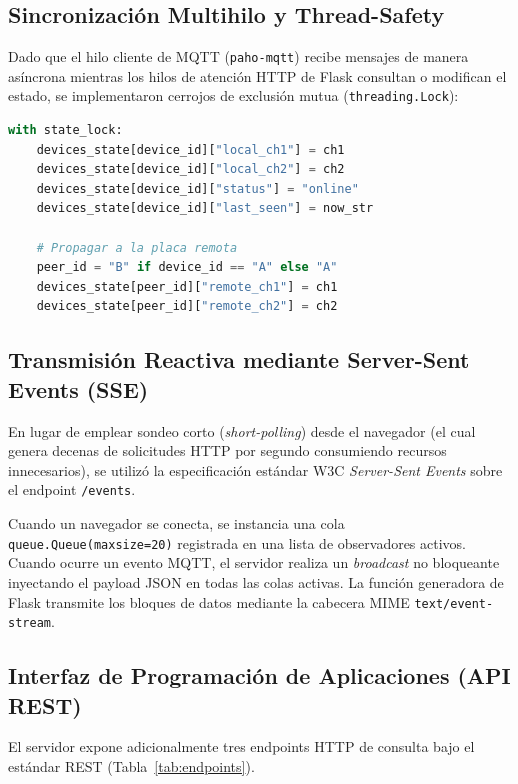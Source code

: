 \documentclass[11pt,a4paper]{article}
\begin{document}
\subsection{Sincronización Multihilo y Thread-Safety}
Dado que el hilo cliente de MQTT (\texttt{paho-mqtt}) recibe mensajes de manera asíncrona mientras los hilos de atención HTTP de Flask consultan o modifican el estado, se implementaron cerrojos de exclusión mutua (\texttt{threading.Lock}):
\begin{lstlisting}[language=Python, caption={Actualización segura de estados en RAM mediante locks}]
with state_lock:
    devices_state[device_id]["local_ch1"] = ch1
    devices_state[device_id]["local_ch2"] = ch2
    devices_state[device_id]["status"] = "online"
    devices_state[device_id]["last_seen"] = now_str
    
    # Propagar a la placa remota
    peer_id = "B" if device_id == "A" else "A"
    devices_state[peer_id]["remote_ch1"] = ch1
    devices_state[peer_id]["remote_ch2"] = ch2
\end{lstlisting}

\subsection{Transmisión Reactiva mediante Server-Sent Events (SSE)}
En lugar de emplear sondeo corto (\textit{short-polling}) desde el navegador (el cual genera decenas de solicitudes HTTP por segundo consumiendo recursos innecesarios), se utilizó la especificación estándar W3C \textit{Server-Sent Events} sobre el endpoint \texttt{/events}. 

Cuando un navegador se conecta, se instancia una cola \texttt{queue.Queue(maxsize=20)} registrada en una lista de observadores activos. Cuando ocurre un evento MQTT, el servidor realiza un \textit{broadcast} no bloqueante inyectando el payload JSON en todas las colas activas. La función generadora de Flask transmite los bloques de datos mediante la cabecera MIME \texttt{text/event-stream}.

\subsection{Interfaz de Programación de Aplicaciones (API REST)}
El servidor expone adicionalmente tres endpoints HTTP de consulta bajo el estándar REST (Tabla~\ref{tab:endpoints}).
\end{document}
